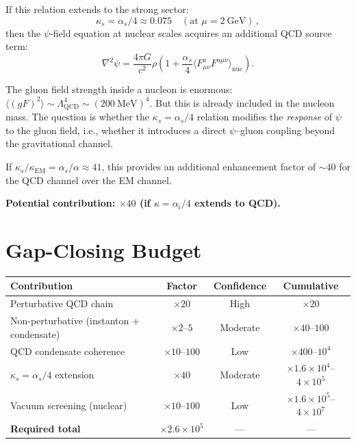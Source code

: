 \documentclass[aps,prd,twocolumn,superscriptaddress,floatfix,nofootinbib]{revtex4-2}
\newcommand{\kap}{\kappa}
\newcommand{\LQCD}{\Lambda_{\mathrm{QCD}}}
\newcommand{\as}{\alpha_s}
\newcommand{\alphafine}{\alpha}
\begin{document}
If this relation extends to the strong sector:
\begin{equation}
\kap_s = \as/4 \approx 0.075 \quad (\text{at } \mu = 2~\text{GeV}) \, ,
\end{equation}
then the $\psi$-field equation at nuclear scales acquires an additional
QCD source term:
\begin{equation}
\nabla^2\psi = \frac{4\pi G}{c^2} \rho \left(1 + \frac{\as}{4}
\langle F^a_{\mu\nu} F^{a\mu\nu} \rangle_{\mathrm{nuc}}\right) .
\end{equation}

The gluon field strength inside a nucleon is enormous:
$\langle (g F)^2 \rangle \sim \LQCD^4 \sim (200~\text{MeV})^4$. But this
is already included in the nucleon mass. The question is whether the
$\kap_s = \as/4$ relation modifies the \emph{response} of $\psi$ to the
gluon field, i.e., whether it introduces a direct $\psi$--gluon coupling
beyond the gravitational channel.

If $\kap_s/\kap_{\mathrm{EM}} = \as/\alphafine \approx 41$, this provides an
additional enhancement factor of $\sim 40$ for the QCD channel over the EM
channel.

\textbf{Potential contribution: $\times 40$ (if $\kap = \alpha_i/4$ extends
to QCD).}


\section{Gap-Closing Budget}\label{sec:budget}

\begin{center}
\renewcommand{\arraystretch}{1.4}
\begin{tabular}{lccc}
\toprule
\textbf{Contribution} & \textbf{Factor} & \textbf{Confidence} &
\textbf{Cumulative} \\
\midrule
Perturbative QCD chain & $\times 20$ & High & $\times 20$ \\
Non-perturbative (instanton + condensate) & $\times 2$--$5$ & Moderate &
$\times 40$--$100$ \\
QCD condensate coherence & $\times 10$--$100$ & Low & $\times 400$--$10^4$ \\
$\kap_s = \as/4$ extension & $\times 40$ & Moderate & $\times 1.6 \times
10^4$--$4 \times 10^5$ \\
Vacuum screening (nuclear) & $\times 10$--$100$ & Low & $\times 1.6 \times
10^5$--$4 \times 10^7$ \\
\midrule
\textbf{Required total} & $\times 2.6 \times 10^5$ & --- & --- \\
\bottomrule
\end{tabular}
\end{center}
\end{document}
